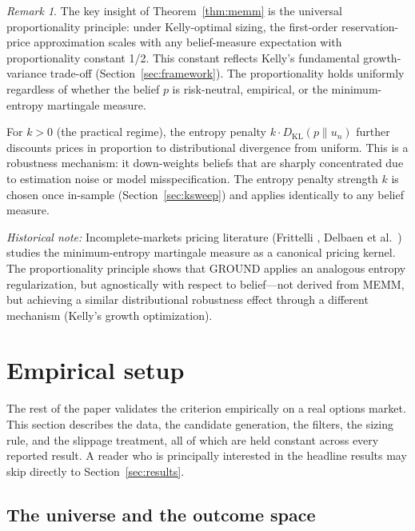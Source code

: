 \documentclass[11pt]{article}
\theoremstyle{definition}
\theoremstyle{remark}
\newtheorem{remark}[theorem]{Remark}
\newcommand{\KL}{D_{\mathrm{KL}}}
\begin{document}
\begin{remark}
The key insight of Theorem~\ref{thm:memm} is the universal proportionality principle: under Kelly-optimal sizing,
the first-order reservation-price approximation scales with any belief-measure expectation with proportionality constant 1/2.
This constant reflects Kelly's fundamental growth-variance trade-off (Section~\ref{sec:framework}).
The proportionality holds uniformly regardless of whether the belief $p$ is risk-neutral, empirical, or the minimum-entropy martingale measure.

For $k > 0$ (the practical regime), the entropy penalty $k \cdot \KL(p \| u_n)$ further discounts prices in proportion to
distributional divergence from uniform. This is a robustness mechanism: it down-weights beliefs
that are sharply concentrated due to estimation noise or model misspecification. The entropy penalty
strength $k$ is chosen once in-sample (Section~\ref{sec:ksweep}) and applies identically to any belief measure.

\emph{Historical note:} Incomplete-markets pricing literature (Frittelli \cite{frittelli2000}, Delbaen et al.\ \cite{delbaen2002})
studies the minimum-entropy martingale measure as a canonical pricing kernel. The proportionality principle
shows that GROUND applies an analogous entropy regularization, but agnostically with respect to belief—not derived from MEMM, but
achieving a similar distributional robustness effect through a different mechanism (Kelly's growth optimization).
\end{remark}


\section{Empirical setup}\label{sec:strategy}

The rest of the paper validates the criterion empirically on a real
options market. This section describes the data, the candidate
generation, the filters, the sizing rule, and the slippage
treatment, all of which are held constant across every reported
result. A reader who is principally interested in the headline
results may skip directly to Section~\ref{sec:results}.

\subsection{The universe and the outcome space}
\end{document}
